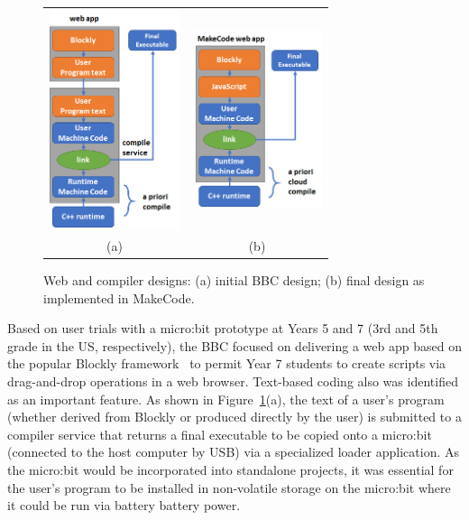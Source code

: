   \begin{figure} 
      \begin{tabular}{cc}
        \includegraphics[width=1.5in]{images/bbc.png} &
        \includegraphics[width=1.5in]{images/makecode.png} \\
        (a) & (b) 
      \end{tabular}
    \caption{\label{fig:design}Web and compiler designs: (a) initial BBC design;
(b) final design as implemented in MakeCode.}
  \end{figure}

Based on user trials with a micro:bit prototype at Years 5 and 7 (3rd and 5th grade
in the US, respectively), the BBC focused on delivering a web app 
based on the popular Blockly framework~\cite{XYZ} to permit Year 7 students to
create scripts via drag-and-drop operations in a web browser.  
Text-based coding also was identified as an important feature.
As shown in Figure~\ref{fig:design}(a),
the text of a user's program (whether derived from Blockly or produced directly by the user)
is submitted to a compiler service that returns a final executable to be copied onto a micro:bit (connected to the host 
computer by USB) via a specialized loader application. As the micro:bit would be incorporated 
into standalone projects, it was essential for the user's program to be installed in non-volatile 
storage on the micro:bit where it could be run via battery battery power. 

